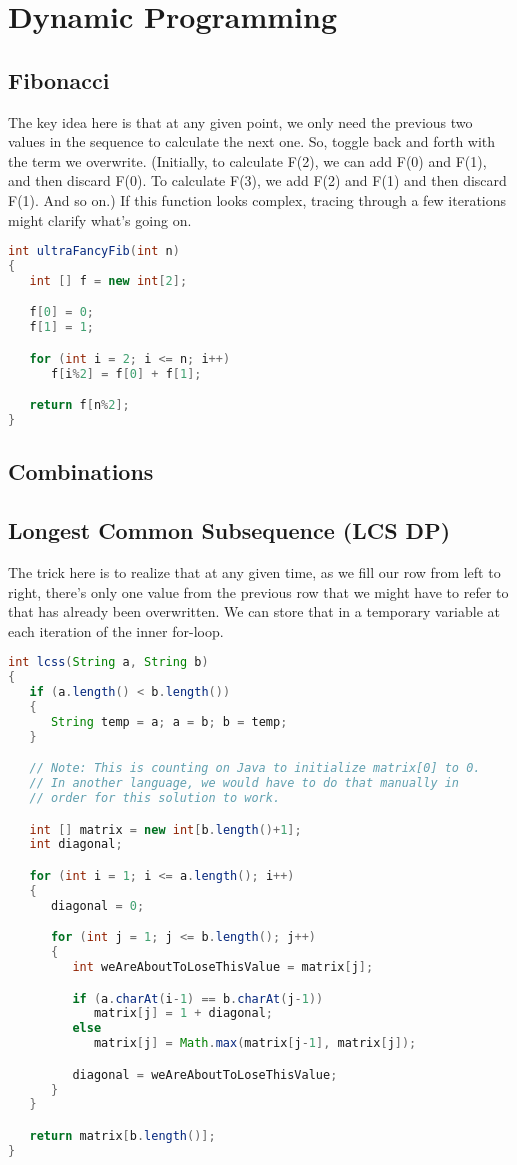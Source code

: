 \section{Dynamic Programming}
\subsection*{Fibonacci}
The key idea here is that at any given point, we only need the previous two values in the sequence to calculate the next one. So, toggle back and forth with the term we overwrite. (Initially, to calculate F(2), we can add F(0) and F(1), and then discard F(0). To calculate F(3), we add F(2) and F(1) and then discard F(1). And so on.) If this function looks complex, tracing through a few iterations might clarify what's going on.

\begin{lstlisting}[language=Java,basicstyle=\tiny]
int ultraFancyFib(int n)
{
   int [] f = new int[2];

   f[0] = 0;
   f[1] = 1;

   for (int i = 2; i <= n; i++)
      f[i%2] = f[0] + f[1];

   return f[n%2];
}
\end{lstlisting}

\subsection*{Combinations}
\lipsum[1][1-2]
\subsection*{Longest Common Subsequence (LCS DP)}
The trick here is to realize that at any given time, as we fill our row from left to right, there's only one value from the previous row that we might have to refer to that has already been overwritten. We can store that in a temporary variable at each iteration of the inner for-loop.

\begin{lstlisting}[language=Java,basicstyle=\tiny]
int lcss(String a, String b)
{
   if (a.length() < b.length())
   {
      String temp = a; a = b; b = temp;
   }

   // Note: This is counting on Java to initialize matrix[0] to 0.
   // In another language, we would have to do that manually in
   // order for this solution to work.

   int [] matrix = new int[b.length()+1];
   int diagonal;

   for (int i = 1; i <= a.length(); i++)
   {
      diagonal = 0;

      for (int j = 1; j <= b.length(); j++)
      {
         int weAreAboutToLoseThisValue = matrix[j];

         if (a.charAt(i-1) == b.charAt(j-1))
            matrix[j] = 1 + diagonal;
         else
            matrix[j] = Math.max(matrix[j-1], matrix[j]);

         diagonal = weAreAboutToLoseThisValue;
      }
   }

   return matrix[b.length()];
}
\end{lstlisting}

